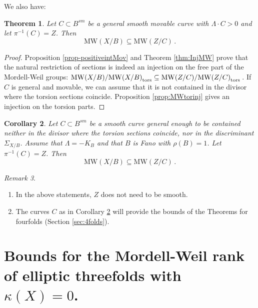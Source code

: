 \documentclass[11pt]{amsart}
\newtheorem{theorem}{Theorem}[section]
\newtheorem{corollary}[theorem]{Corollary}
\theoremstyle{definition}
\theoremstyle{definition}
\theoremstyle{remark}
\newtheorem{remark}[theorem]{Remark}
\theoremstyle{remark}
\theoremstyle{definition}
\theoremstyle{conjecture}
\newcommand{\MW}{\mathrm{MW}}
\begin{document}
We also have:

\begin{theorem}\label{thm:MWNSMovInjTotal}
 Let $C \subset B^{sm}  %
 $ be  a   general smooth  movable curve    
 with $\Lambda \cdot C > 0$ and let $\pi^{-1}(C)=Z$.
 Then
\[ 
\MW(X/B)  \subseteq  \MW(Z/C)   \,.
\]
\end{theorem}

\begin{proof}  Proposition \ref{prop-positiveintMov} and 
    Theorem \ref{thm:InjMW} prove that the natural restriction of sections is indeed  an injection  on the free part of the Mordell-Weil groups: $
\MW(X/B)/{\MW(X/B)}_{\rm tors}  \subseteq  \MW(Z/C)/ {\MW(Z/C)}_{\rm tors}  \,$.
    If $C$ is general and movable, we can assume that it is not contained in the divisor where the  torsion sections coincide. Proposition \ref{prop:MWtorinj} gives an injection on the torsion parts.
\end{proof}




\begin{corollary}\label{cor:MWNSSingInjTotal}  Let  $C \subset B^{sm} %
$  be a  smooth  
curve general enough to be contained neither in the  divisor where the  torsion sections coincide, nor in the discriminant $ \Sigma_{X/B} $.  Assume that $\Lambda = -K_B$ and that $B$ is Fano with $\rho(B)=1$. Let   $\pi^{-1}(C)=Z$.   Then
    \[ 
\MW(X/B)  \subseteq  \MW(Z/C)   \,.
\]
\end{corollary}
\begin{remark}\label{remark:inclusionMWTYpesOfC}
\begin{enumerate}
    \item In the above statements, $Z$ does not need to be smooth.
    \item   The curves  $C$ as in Corollary \ref{cor:MWNSSingInjTotal}  will provide the bounds of the Theorems for fourfolds (Section \ref{sec:4folds}).
\end{enumerate}
\end{remark}




\color{black}
\section{
Bounds for the Mordell-Weil rank of elliptic %
threefolds with $\kappa (X)=0$.}\label{sec:dim3}
\end{document}
